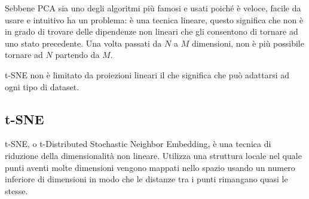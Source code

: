 \documentclass[12pt,italian]{report}
\begin{document}
Sebbene PCA sia uno degli algoritmi più famosi e usati poiché è veloce, facile da usare e intuitivo ha un problema: è una tecnica lineare, questo significa che non è in grado di trovare delle dipendenze non lineari che gli consentono di tornare ad uno stato precedente. Una volta passati da $N$ a $M$ dimensioni, non è più possibile tornare ad $N$ partendo da $M$.

t-SNE non è limitato da proiezioni lineari il che significa che può adattarsi ad ogni tipo di dataset.
\subsection{t-SNE}
t-SNE, o t-Distributed Stochastic Neighbor Embedding, è una tecnica di riduzione della dimensionalità non lineare. Utilizza una struttura locale nel quale punti aventi molte dimensioni vengono mappati nello spazio usando un numero inferiore di dimensioni in modo che le distanze tra i punti rimangano quasi le stesse.
 
\end{document}
